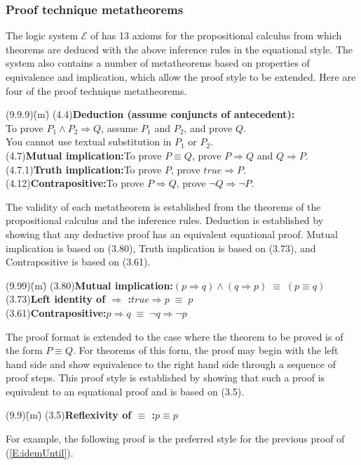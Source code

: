 \documentclass[12pt, fleqn, leqno]{article}
\newcommand{\lgap}{2pt}                             %
\newcommand{\equivs}{\ensuremath{\;\equiv\;}}       %
\newcommand{\impl}{\ensuremath{\Rightarrow}}        %
\begin{document}
\subsubsection*{Proof technique metatheorems}

The logic system $\mathcal{E}$ of \cite{LADM} has 13 axioms for the propositional calculus from which theorems are deduced
with the above inference rules in the equational style.
The system also contains a number of metatheorems based on properties of equivalence and implication, which allow the
proof style to be extended.
Here are four of the proof technique metatheorems.
\begin{tabbing}
(9.9.9)\;\=(m)\;\=\kill
(4.4)\>\textbf{Deduction (assume conjuncts of antecedent):}\\[\lgap]
      \>To prove $P_{1}\land P_{2}\impl Q$, assume $P_{1}$ and $P_{2}$, and prove $Q$.\\[\lgap]
      \>You cannot use textual substitution in $P_{1}$ or $P_{2}$.\\[\lgap]
(4.7)\>\textbf{Mutual implication:}\quad To prove $P\equiv Q$, prove $P\impl Q$ and $Q\impl P$.\\[\lgap]
(4.7.1)\>\textbf{Truth implication:}\quad To prove $P$, prove $true\impl P$.\\[\lgap]
(4.12)\>\textbf{Contrapositive:}\quad To prove $P\impl Q$, prove $\neg Q\impl \neg P$.
\end{tabbing}

The validity of each metatheorem is established from the theorems of the propositional calculus and the inference rules.
Deduction is established by showing that any deductive proof has an equivalent equational proof.
Mutual implication is based on (3.80), Truth implication is based on (3.73), and Contrapositive is based on (3.61).
\begin{tabbing}
(9.99)\;\=(m)\;\=\kill
(3.80)\>\textbf{Mutual implication:}\quad $(p\impl q) \land (q\impl p) \equivs (p\equiv q)$\\[\lgap]
(3.73)\>\textbf{Left identity of $\impl$ :}\quad $true\impl p \equivs p$\\[\lgap]
(3.61)\>\textbf{Contrapositive:}\quad $p\impl q \equivs \neg q\impl \neg p$
\end{tabbing}

The proof format is extended to the case where the theorem to be proved is of the form $P \equiv Q$.
For theorems of this form, the proof may begin with the left hand side and show equivalence to the right hand side through a sequence of proof steps.
This proof style is established by showing that such a proof is equivalent to an equational proof and is based on (3.5).
\begin{tabbing}
(9.9)\;\=(m)\;\=\kill
(3.5)\>\textbf{Reflexivity of $\equiv$ :}\quad $p\equiv p$
\end{tabbing}
For example, the following proof is the preferred style for the previous proof of (\ref{E:idemUntil}).
\end{document}
